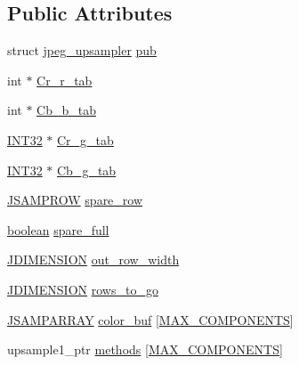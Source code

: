 \subsection*{Public Attributes}
\begin{DoxyCompactItemize}
\item 
struct \mbox{\hyperlink{structjpeg__upsampler}{jpeg\+\_\+upsampler}} \mbox{\hyperlink{structmy__upsampler_a34dcee6f85a807bcacec127661432823}{pub}}
\item 
int $\ast$ \mbox{\hyperlink{structmy__upsampler_a4f008494aac28cbf152a2bf05049dfca}{Cr\+\_\+r\+\_\+tab}}
\item 
int $\ast$ \mbox{\hyperlink{structmy__upsampler_a0e7a2bfa2d928b6643497e092ac68205}{Cb\+\_\+b\+\_\+tab}}
\item 
\mbox{\hyperlink{jmorecfg_8h_a0cb58e7e6f0bad369840a52e54a56ae0}{I\+N\+T32}} $\ast$ \mbox{\hyperlink{structmy__upsampler_a1a14abca6bd59cb35c4e3ee51f1ed8f5}{Cr\+\_\+g\+\_\+tab}}
\item 
\mbox{\hyperlink{jmorecfg_8h_a0cb58e7e6f0bad369840a52e54a56ae0}{I\+N\+T32}} $\ast$ \mbox{\hyperlink{structmy__upsampler_af9bf33b5de13df22004b7f0f99d8195d}{Cb\+\_\+g\+\_\+tab}}
\item 
\mbox{\hyperlink{jpeglib_8h_ace11642f14c454c9ddbe2741132f4e68}{J\+S\+A\+M\+P\+R\+OW}} \mbox{\hyperlink{structmy__upsampler_a000b6953c558f05f68e56c2c08c12902}{spare\+\_\+row}}
\item 
\mbox{\hyperlink{jmorecfg_8h_a7c6368b321bd9acd0149b030bb8275ed}{boolean}} \mbox{\hyperlink{structmy__upsampler_a98ee90ab9a83d6d1c16c073826c34e51}{spare\+\_\+full}}
\item 
\mbox{\hyperlink{jmorecfg_8h_a04ed4674f6f1d0d50ec241531e38274f}{J\+D\+I\+M\+E\+N\+S\+I\+ON}} \mbox{\hyperlink{structmy__upsampler_a315364082734b3779abccc258a2954e8}{out\+\_\+row\+\_\+width}}
\item 
\mbox{\hyperlink{jmorecfg_8h_a04ed4674f6f1d0d50ec241531e38274f}{J\+D\+I\+M\+E\+N\+S\+I\+ON}} \mbox{\hyperlink{structmy__upsampler_a1a6b9998ad6a7501dd5287295fd8adc4}{rows\+\_\+to\+\_\+go}}
\item 
\mbox{\hyperlink{jpeglib_8h_ac9d5d1b829ed51769db69a37271a7e91}{J\+S\+A\+M\+P\+A\+R\+R\+AY}} \mbox{\hyperlink{structmy__upsampler_a72da5ad87430b974aeabce55c30eb653}{color\+\_\+buf}} \mbox{[}\mbox{\hyperlink{jmorecfg_8h_a6d8c910a1fdb6d4762a05f7250e64322}{M\+A\+X\+\_\+\+C\+O\+M\+P\+O\+N\+E\+N\+TS}}\mbox{]}
\item 
upsample1\+\_\+ptr \mbox{\hyperlink{structmy__upsampler_a3f1f669c2871ccaee6009ec6f96899d3}{methods}} \mbox{[}\mbox{\hyperlink{jmorecfg_8h_a6d8c910a1fdb6d4762a05f7250e64322}{M\+A\+X\+\_\+\+C\+O\+M\+P\+O\+N\+E\+N\+TS}}\mbox{]}

\end{DoxyCompactItemize}
